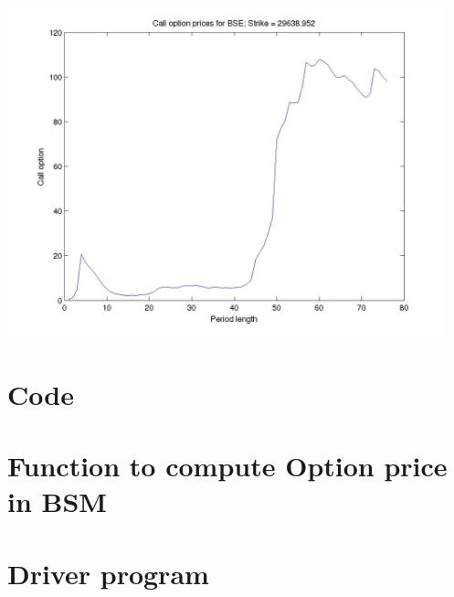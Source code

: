 \documentclass[12pt]{article}
\begin{document}
\begin{center}
      \includegraphics[width=5in]{put_strike10.jpg}
    \end{center}

\section{Code}
  \section{Function to compute Option price in BSM}
    
  \section{Driver program}
    
\end{document}
